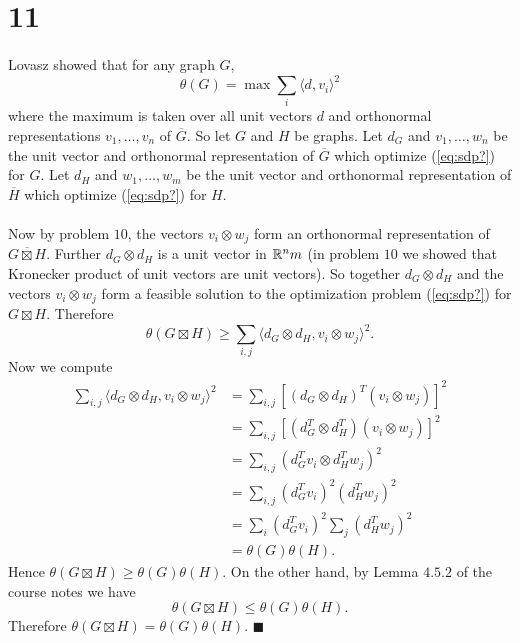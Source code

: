 \documentclass[letterpaper,12pt,oneside,onecolumn]{article}
\newcommand{\1}{\mathbbm{1}}
\begin{document}
\section*{11}
\paragraph{}
Lovasz showed that for any graph $G$,
\begin{equation}\theta(G) = \max \sum_{i} \langle d, v_i\rangle ^2\label{eq:sdp?} \end{equation}
where the maximum is taken over all unit vectors $d$ and orthonormal representations $v_1, \dots, v_n$ of $\overline{G}$. So let $G$ and $H$ be graphs. Let $d_G$ and $v_1, \dots, w_n$ be the unit vector and orthonormal representation of $\overline{G}$ which optimize (\ref{eq:sdp?}) for $G$. Let $d_H$ and $w_1, \dots, w_m$ be the unit vector and orthonormal representation of $\overline{H}$ which optimize (\ref{eq:sdp?}) for $H$.
\paragraph{}
Now by problem $10$, the vectors $v_i \otimes w_j$ form an orthonormal representation of $\overline{G \boxtimes H}$. Further $d_G \otimes d_H$ is a unit vector in $\mathbb{R}^nm$ (in problem $10$ we showed that Kronecker product of unit vectors are unit vectors). So together $d_G \otimes d_H$ and the vectors $v_i \otimes w_j$ form a feasible solution to the optimization problem (\ref{eq:sdp?}) for $G \boxtimes H$. Therefore
$$\theta(G\boxtimes H) \geq \sum_{i,j} \langle d_G\otimes d_H, v_i \otimes w_j \rangle^2.$$
Now we compute
\begin{align*}
\sum_{i,j} \langle d_G\otimes d_H, v_i \otimes w_j \rangle^2  &= \sum_{i,j}[(d_G\otimes d_H)^T(v_i \otimes w_j)]^2 \\
&= \sum_{i,j}[(d_G^T \otimes d_H^T)(v_i \otimes w_j)]^2 \\
&= \sum_{i,j}(d_G^Tv_i \otimes d_H^Tw_j)^2 \\
&= \sum_{i,j}(d_G^Tv_i)^2 (d_H^Tw_j)^2 \\
&= \sum_i (d_G^Tv_i)^2 \sum_j (d_H^Tw_j)^2\\
&= \theta(G)\theta(H).
\end{align*}
Hence $\theta(G\boxtimes H) \geq \theta(G)\theta(H)$. On the other hand, by Lemma $4.5.2$ of the course notes we have
$$\theta(G\boxtimes H) \leq \theta(G) \theta(H).$$
Therefore $\theta(G \boxtimes H) = \theta(G) \theta(H)$. $\blacksquare$
\end{document}
